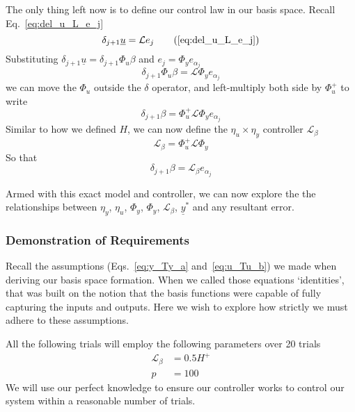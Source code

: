 The only thing left now is to define our control law in our basis space. Recall Eq.~\ref{eq:del_u_L_e_j}
\begin{equation}
    \delta_{j+1}\underline{u}=\mathcal{L}e_j
    \tag{\ref{eq:del_u_L_e_j}}
\end{equation}
Substituting \(\delta_{j+1}\underline{u} = \delta_{j+1}\Phi_u\beta\) and \(e_j = \Phi_y e_{\alpha_j}\)
\begin{equation}
    \delta_{j+1}\Phi_u\beta = \mathcal{L} \Phi_y e_{\alpha_j}
\end{equation}
we can move the $\Phi_u$ outside the $\delta$ operator, and left-multiply both side by $\Phi_u^+$ to write
\begin{equation}
    \delta_{j+1} \beta = \Phi_u^+ \mathcal{L} \Phi_y e_{\alpha_j}
\end{equation}
Similar to how we defined $H$, we can now define the $\eta_u \times \eta_y$ controller $\mathcal{L}_\beta$
\begin{equation}
   \mathcal{L}_\beta = \Phi_u^+ \mathcal{L} \Phi_y
\end{equation}
So that
\begin{equation}
    \delta_{j+1} \beta = \mathcal{L}_\beta e_{\alpha_j}
    \label{eq:basis_ilc_control_law}
\end{equation}


Armed with this exact model and controller, we can now explore the the relationships between $\eta_y$, $\eta_u$, $\Phi_y$, $\Phi_y$, $\mathcal{L}_\beta$, $\underline{y}^\ast$ and any resultant error.

\FloatBarrier\subsubsection{Demonstration of Requirements}
Recall the assumptions (Eqs.~\ref{eq:y_Ty_a} and~\ref{eq:u_Tu_b}) we made when deriving our basis space formation.
When we called those equations `identities', that was built on the notion that the basis functions were capable of fully capturing the inputs and outputs. 
Here we wish to explore how strictly we must adhere to these assumptions.

All the following trials will employ the following parameters over 20 trials
\begin{align}
    \mathcal{L}_\beta &= 0.5H^+ \\
    p &= 100
\end{align}
We will use our perfect knowledge to ensure our controller works to control our system within a reasonable number of trials.

